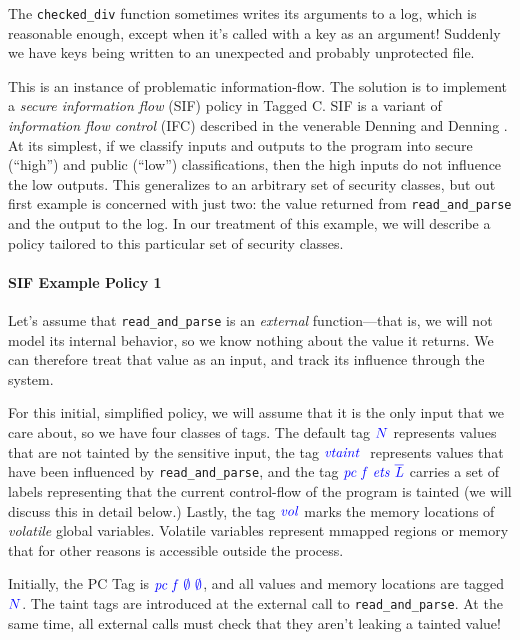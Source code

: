 \documentclass{llncs}
\begin{document}
The {\tt checked\_div} function sometimes writes its arguments to a log,
which is reasonable enough, except when it's called with a key as an argument!
Suddenly we have keys being written to an unexpected and probably unprotected file.

This is an instance of problematic information-flow. The solution is to implement
a {\em secure information flow} (SIF) policy in Tagged C. SIF is a variant of
{\em information flow control} (IFC) described in the venerable Denning and Denning
\cite{Denning77:SecureInformationFlow}. At its simplest, if we classify inputs and outputs to
the program into secure (``high'') and public (``low'') classifications, then the
high inputs do not influence the low outputs. This generalizes to an arbitrary set
of security classes, but out first example is concerned with just two: the value
returned from {\tt read\_and\_parse} and the output to the log.
In our treatment of this example, we will describe a policy tailored to this particular
set of security classes.

\paragraph*{SIF Example Policy 1}

Let's assume that {\tt read\_and\_parse} is an {\em external} function---that is, we will not
model its internal behavior, so we know nothing about the value it returns. We can therefore
treat that value as an input, and track its influence through the system.

For this initial, simplified policy, we will assume that it is the only input that we care about,
so we have four classes of tags. The default tag \({\color{blue} N}\) represents values that are not tainted
by the sensitive input, the tag \(\mathit{\color{blue} vtaint ~ }\) represents values that have been influenced by
{\tt read\_and\_parse}, and the tag \(\mathit{\color{blue} pc ~ f ~ ets ~ \overline{L}}\) carries a set of labels
representing that the current control-flow of the program is tainted (we will discuss this in detail
below.) Lastly, the tag \(\mathit{\color{blue} vol}\) marks the memory locations of {\em volatile} global variables.
Volatile variables represent mmapped regions or memory that for other reasons is accessible
outside the process.

Initially, the PC Tag is \(\mathit{\color{blue} pc ~ f ~ \emptyset ~ \emptyset}\), and all values and memory locations are
tagged \({\color{blue} N}\). The taint tags are introduced at the external call to {\tt read\_and\_parse}.
At the same time, all external calls must check that they aren't leaking a tainted value!
\end{document}
